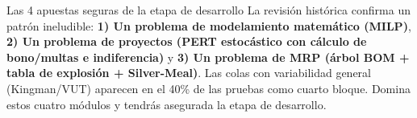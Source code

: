\begin{tipprueba}{Las 4 apuestas seguras de la etapa de desarrollo}
La revisión histórica confirma un patrón ineludible: \textbf{1) Un problema de modelamiento matemático (MILP)}, \textbf{2) Un problema de proyectos (PERT estocástico con cálculo de bono/multas e indiferencia)} y \textbf{3) Un problema de MRP (árbol BOM + tabla de explosión + Silver-Meal)}. Las colas con variabilidad general (Kingman/VUT) aparecen en el 40\% de las pruebas como cuarto bloque. Domina estos cuatro módulos y tendrás asegurada la etapa de desarrollo.
\end{tipprueba}


